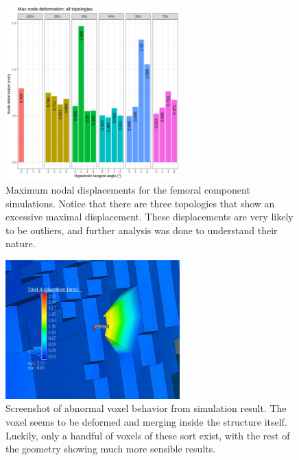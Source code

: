 \documentclass[../main.tex]{subfiles}
\begin{document}
\begin{figure}[h!]
  \centering
  \includegraphics[width=0.6\textwidth]{images/results/plots/femoral/displacement/femoral_max_bad.png}
  \caption{Maximum nodal displacements for the femoral component simulations. Notice that there are three topologies that show an excessive maximal displacement. These displacements are very likely to be outliers, and further analysis was done to understand their nature.}
  \label{fig:disp_max_bad}
\end{figure}

\begin{figure}[h!]
  \centering
  \includegraphics[width=0.6\textwidth]{images/bad_voxel.png}
  \caption{Screenshot of abnormal voxel behavior from simulation result. The voxel seems to be deformed and merging inside the structure itself. Luckily, only a handful of voxels of these sort exist, with the rest of the geometry showing much more sensible results.}
  \label{fig:bad_voxel}
\end{figure}
\end{document}
